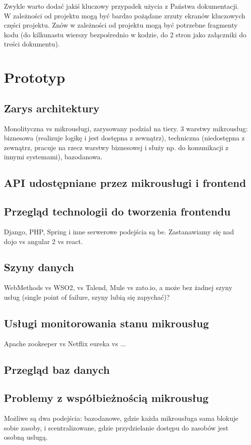 \documentclass[licencjacka]{pracamgr}
\begin{document}
Zwykle warto dodać jakiś kluczowy przypadek użycia z Państwa dokumentacji. W zależności od projektu mogą być bardzo pożądane zrzuty ekranów kluczowych części projektu. Znów w zależności od projektu mogą być potrzebne fragmenty kodu (do kilkunastu wierszy bezpośrednio w kodzie, do 2 stron jako załączniki do treści dokumentu).

\chapter{Prototyp}\label{r:prototyp}
\section{Zarys architektury}
Monolityczna vs mikrousługi, zarysowany podział na tiery.
3 warstwy mikrousług: biznesowa (realizuje logikę i jest dostępna z zewnątrz),
techniczna (niedostępna z zewnątrz, pracuje na rzecz warstwy biznesowej i służy np. do komunikacji
z innymi systemami), bazodanowa.
\section{API udostępniane przez mikrousługi i frontend}
\section{Przegląd technologii do tworzenia frontendu}
Django, PHP, Spring i inne serwerowe podejścia są be. Zastanawiamy się nad dojo vs angular 2 vs react.
\section{Szyny danych}
WebMethods vs WSO2, vs Talend, Mule vs zato.io, a może bez żadnej szyny usług (single point of failure, szyny lubią się zapychać)?
\section{Usługi monitorowania stanu mikrousług}
Apache zookeeper vs Netflix eureka vs ...
\section{Przegląd baz danych}
\section{Problemy z współbieżnością mikrousług}
Możliwe są dwa podejścia: bazodanowe, gdzie każda mikrousługa sama blokuje sobie zasoby, i 
scentralizowane, gdzie przydzielanie dostępu do zasobów jest osobną usługą.
\end{document}
